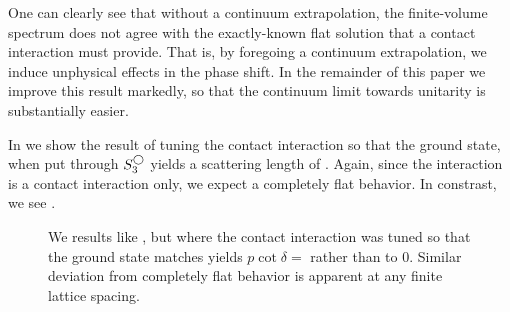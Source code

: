 One can clearly see that without a continuum extrapolation, the finite-volume spectrum does not agree with the exactly-known flat solution that a contact interaction must provide.
That is, by foregoing a continuum extrapolation, we induce unphysical effects in the phase shift.
In the remainder of this paper we improve this result markedly, so that the continuum limit towards unitarity is substantially easier.


In  we show the result of tuning the contact interaction so that the ground state, when put through $S^{\bigcirc}_3$ yields a scattering length of .
Again, since the interaction is a contact interaction only, we expect a completely flat behavior.
In constrast, we see .

\begin{figure}[th]
    
    \caption{We results like , but where the contact interaction was tuned so that the ground state matches yields $p\cot\delta = $ rather than to 0.  Similar deviation from completely flat behavior is apparent at any finite lattice spacing.}
    \label{fig:finite a spherical}
\end{figure}
